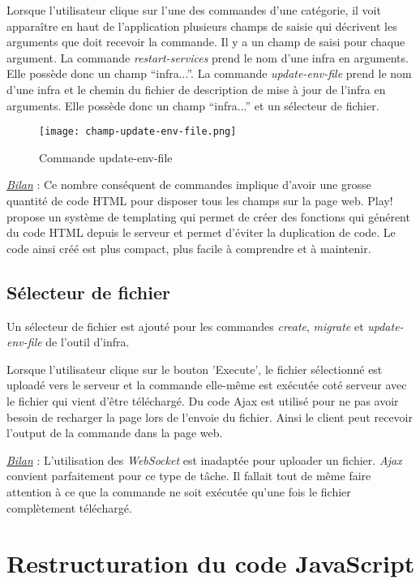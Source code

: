 Lorsque l'utilisateur clique sur l'une des commandes d'une catégorie, il voit
apparaître en haut de l'application plusieurs champs de saisie qui décrivent les
arguments que doit recevoir la commande.
Il y a un champ de saisi pour chaque argument.
La commande \textit{restart-services} prend le nom d'une infra en
arguments. Elle possède donc un champ ``infra...''.
La commande \textit{update-env-file} prend le nom d'une infra et le chemin du
fichier de description de mise à jour de l'infra en arguments. Elle possède donc
un champ ``infra...'' et un sélecteur de fichier.

\begin{figure}[H]
  \begin{center}
    \texttt{[image: champ-update-env-file.png]} 
  \end{center}
  \caption{Commande update-env-file} 
\end{figure}

\underline{\textit{Bilan}} : Ce nombre conséquent de commandes implique d'avoir
une grosse quantité de code HTML pour disposer tous les champs sur la
page web. Play! propose un système de templating qui permet de créer des
fonctions qui générent du code HTML depuis le serveur et permet d'éviter la
duplication de code. Le code ainsi créé est plus compact, plus facile à
comprendre et à maintenir.

\subsection{Sélecteur de fichier}

Un sélecteur de fichier est ajouté pour les commandes \textit{create},
\textit{migrate} et \textit{update-env-file} de l'outil d'infra.

Lorsque l'utilisateur clique sur le bouton 'Execute', le fichier sélectionné est
uploadé vers le serveur et la commande elle-même est exécutée coté serveur avec
le fichier qui vient d'être téléchargé.
Du code Ajax est utilisé pour ne pas avoir besoin de recharger la page lors de
l'envoie du fichier.
Ainsi le client peut recevoir l'output de la commande dans la page web.

\underline{\textit{Bilan}} : L'utilisation des \textit{WebSocket} est inadaptée
pour uploader un fichier. \textit{Ajax} convient parfaitement pour ce type de
tâche. Il fallait tout de même faire attention à ce que la commande ne soit
exécutée qu'une fois le fichier complètement téléchargé.

\section{Restructuration du code JavaScript}

